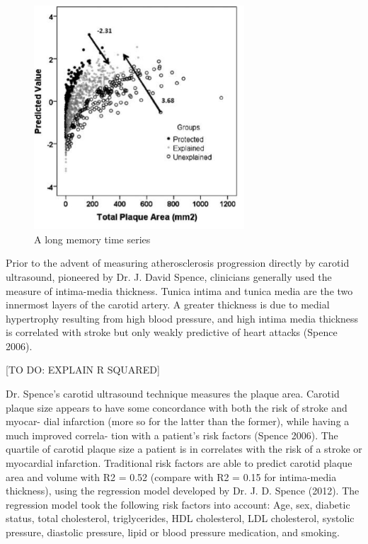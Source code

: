 \begin{figure}[h]
\begin{center}
\includegraphics[width=0.7\textwidth]{risk_vs_plaque.png}
\caption{A long memory time series\label{ts1}}
\end{center}
\end{figure}

Prior to the advent of measuring atherosclerosis progression directly by carotid ultrasound, pioneered by Dr. J. David Spence, clinicians generally used the measure of intima-media thickness. Tunica intima and tunica media are the two innermost layers of the carotid artery. A greater thickness is due to medial hypertrophy resulting from high blood pressure, and high intima media thickness is correlated with stroke but only weakly predictive of heart attacks (Spence 2006).

[TO DO: EXPLAIN R SQUARED]

Dr. Spence’s carotid ultrasound technique measures the plaque area. Carotid plaque size appears to have some concordance with both the risk of stroke and myocar-
dial infarction (more so for the latter than the former), while having a much improved correla-
tion with a patient’s risk factors (Spence 2006). The quartile of carotid plaque size a patient is in correlates with the risk of a stroke or myocardial infarction. Traditional risk factors are able to predict carotid plaque area and volume with R2 = 0.52 (compare with R2 = 0.15 for intima-media thickness), using the regression model developed by Dr. J. D. Spence (2012). The regression model took the following risk factors into account: Age, sex, diabetic status, total cholesterol, triglycerides, HDL cholesterol, LDL cholesterol, systolic pressure, diastolic pressure, lipid or blood pressure medication, and smoking.

